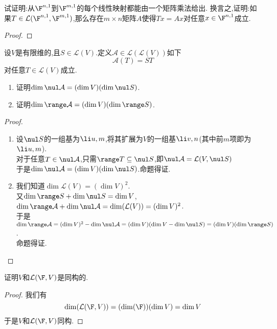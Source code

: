 \documentclass{ctexart}
\begin{document}
\begin{problem}[16.]
    试证明:从$\F^{n,1}$到$\F^{m,1}$的每个线性映射都能由一个矩阵乘法给出.%
    换言之,证明:如果$T\in\mathcal{L}(\F^{n,1},\F^{m,1})$,那么存在$m\times n$矩阵$A$使得$Tx=Ax$对任意$x\in\F^{n,1}$成立.
\end{problem}
\begin{proof}
    
\end{proof}
\begin{problem}[17.]
    设$V$是有限维的,且$S\in\mathcal{L}(V)$.定义$\mathcal{A}\in\mathcal{L}(\mathcal{L}(V))$如下
    $$\mathcal{A}(T)=ST$$
    对任意$T\in\mathcal{L}(V)$成立.
    \begin{enumerate}[label=\tbf{(\arabic*)}]
        \item 证明$\dim\nul\mathcal{A}=(\dim V)(\dim\nul S)$.
        \item 证明$\dim\range\mathcal{A}=(\dim V)(\dim\range S)$.
    \end{enumerate}
\end{problem}
\begin{proof}
    \begin{enumerate}[label=\tbf{(\arabic*)}]
        \item 设$\nul S$的一组基为$\li u,m$,将其扩展为$V$的一组基$\li v,n$(其中前$m$项即为$\li u,m$).\\
            对于任意$T\in\nul\mathcal{A}$,只需$\range T\subseteq\nul S$,即$\nul\mathcal{A}=\mathcal{L}(V,\nul S)$\\
            于是$\dim\nul\mathcal{A}=(\dim V)(\dim \nul S)$.命题得证.
        \item 我们知道$\dim \mathcal{L}(V)=\left(\dim V\right)^2$.\\
            又$\dim\range S+\dim\nul S=\dim V$,$\dim\range\mathcal{A}+\dim\nul\mathcal{A}=\dim(\mathcal{L}(V))=(\dim V)^2$.\\
            于是$\dim\range\mathcal{A}=(\dim V)^2-\dim\nul\mathcal{A}=(\dim V)(\dim V-\dim\nul S)=(\dim V)(\dim\range S)$.\\
            命题得证.
    \end{enumerate}
\end{proof}
\begin{problem}[18.]
    证明$V$和$\mathcal{L}(\F,V)$是同构的.
\end{problem}
\begin{proof}
    我们有
    $$\dim(\mathcal{L}(\F,V))=(\dim(\F))(\dim V)=\dim V$$
    于是$V$和$\mathcal{L}(\F,V)$同构.
\end{proof}
\end{document}
